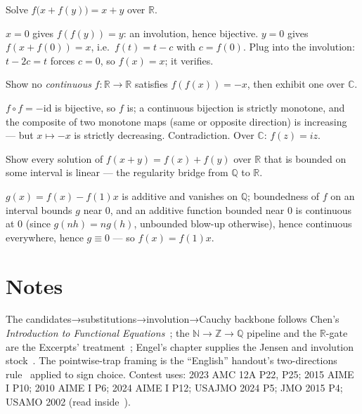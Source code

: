 \begin{exercise}[medium]\label{exr:fa13}
Solve $f\bigl(x+f(y)\bigr)=x+y$ over $\mathbb R$.
\end{exercise}
\begin{solution}
$x=0$ gives $f(f(y))=y$: an involution, hence bijective. $y=0$ gives
$f(x+f(0))=x$, i.e.\ $f(t)=t-c$ with $c=f(0)$. Plug into the
involution: $t-2c=t$ forces $c=0$, so $f(x)=x$; it verifies.
\end{solution}
\begin{exercise}[hard]\label{exr:fa14}
Show no \emph{continuous} $f:\mathbb R\to\mathbb R$ satisfies
$f(f(x))=-x$, then exhibit one over $\mathbb C$.
\end{exercise}
\begin{solution}
$f\circ f=-\mathrm{id}$ is bijective, so $f$ is; a continuous bijection
is strictly monotone, and the composite of two monotone maps (same or
opposite direction) is increasing --- but $x\mapsto -x$ is strictly
decreasing. Contradiction. Over $\mathbb C$: $f(z)=iz$.
\end{solution}
\begin{exercise}[hard]\label{exr:fa15}
Show every solution of $f(x+y)=f(x)+f(y)$ over $\mathbb R$ that is
bounded on some interval is linear --- the regularity bridge from
$\mathbb Q$ to $\mathbb R$.
\end{exercise}
\begin{solution}
$g(x)=f(x)-f(1)x$ is additive and vanishes on $\mathbb Q$; boundedness
of $f$ on an interval bounds $g$ near $0$, and an additive function
bounded near $0$ is continuous at $0$ (since $g(nh)=ng(h)$, unbounded
blow-up otherwise), hence continuous everywhere, hence $g\equiv0$ ---
so $f(x)=f(1)x$.
\end{solution}

\section*{Notes}
The candidates→substitutions→involution→Cauchy backbone follows Chen's
\emph{Introduction to Functional Equations}~\cite{chen-funceq}; the
$\mathbb N\to\mathbb Z\to\mathbb Q$ pipeline and the $\mathbb R$-gate are the Excerpts'
treatment~\cite{otis}; Engel's chapter supplies the Jensen and
involution stock~\cite{engel}. The pointwise-trap framing is the
``English'' handout's two-directions rule~\cite{chen-english} applied to
sign choice. Contest uses: 2023 AMC 12A P22, P25; 2015 AIME I P10;
2010 AIME I P6; 2024 AIME I P12; USAJMO 2024 P5; JMO 2015 P4; USAMO
2002 (read inside~\cite{chen-funceq}).

